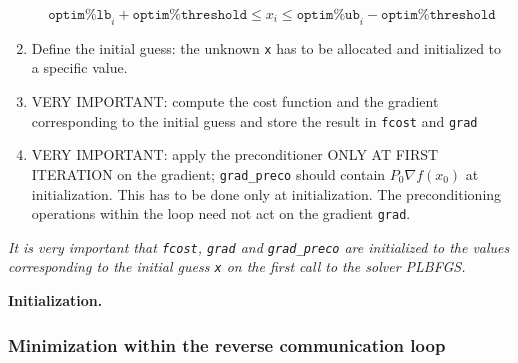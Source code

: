 \documentclass[a4paper,twoside,final,onecolumn,11pt,openright]{article}
\begin{document}
\begin{enumerate}
\begin{equation}
 \texttt{optim\%lb}_i + \texttt{optim\%threshold} \leq x_i \leq \texttt{optim\%ub}_i - \texttt{optim\%threshold}
\end{equation}
\item Define the initial guess: the unknown \texttt{x} has to be allocated and initialized to a specific value. 
\item VERY IMPORTANT: compute the cost function and the gradient corresponding to the initial guess and store the result in \texttt{fcost} and \texttt{grad} 
\item VERY IMPORTANT: apply the preconditioner ONLY AT FIRST ITERATION on the gradient; \texttt{grad\_preco} should contain $P_0\nabla f(x_0)$ at initialization. This has to be done only at initialization. The preconditioning operations within the loop  need not act on the gradient \texttt{grad}.
\end{enumerate}
\textit{It is very important that \texttt{fcost}, \texttt{grad} and \texttt{grad\_preco} are initialized to the values corresponding to the initial guess \texttt{x} on the first call to the solver PLBFGS.}

\framebox{
\small
 
}
\normalsize
\begin{center}
\textbf{Initialization.} 
\end{center}

\subsubsection{Minimization within the reverse communication loop}
\end{document}

